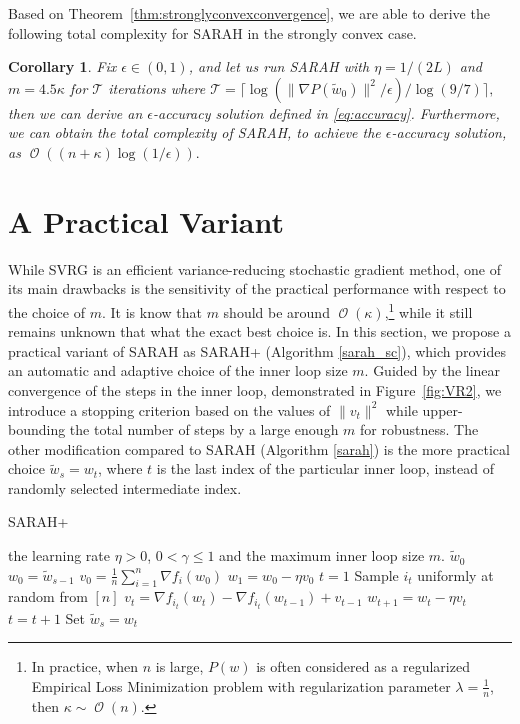 \documentclass{article}
\newtheorem{cor}{Corollary}
\DeclareMathOperator{\Ocal}{\mathcal{O}}
\newcommand{\setn}{[n]}
\begin{document}
Based on Theorem~\ref{thm:stronglyconvexconvergence}, we are able to derive the following total complexity for SARAH in the strongly convex case.
\begin{cor}\label{cor:complexity}
Fix $\epsilon\in(0,1)$, and let us run SARAH with $\eta = 1/(2L)$ and $m = 4.5\kappa$ for $\mathcal{T}$ iterations where
$\mathcal{T} = \lceil \log(\|\nabla P(\tilde{w}_0)\|^2/\epsilon)/\log(9/7) \rceil,$
then we can derive an $\epsilon$-accuracy solution defined in \eqref{eq:accuracy}. Furthermore, we can obtain the total complexity of SARAH, to achieve the $\epsilon$-accuracy solution, as
$\Ocal\left((n+\kappa)\log(1/\epsilon)\right).$
\end{cor}

\section{A Practical Variant}
\label{sec:sarahplus}
While SVRG is an efficient variance-reducing stochastic gradient method, one of its main drawbacks is the sensitivity of the practical performance with respect to the choice of $m$. It is know that $m$ should be around $\Ocal(\kappa)$,\footnote{
In practice, when $n$ is large, $P(w)$ is often considered as a regularized Empirical Loss Minimization problem with regularization parameter $\lambda = \frac1n$, then $\kappa \sim \Ocal(n).$
}
 while it still remains unknown that what the exact best choice is. In this section, we propose a practical variant of SARAH as SARAH+ (Algorithm \ref{sarah_sc}), which provides an automatic and adaptive  choice of the inner loop size $m$. Guided by the linear convergence of the steps in the inner loop, demonstrated in Figure~\ref{fig:VR2}, we introduce a stopping criterion based on the values of $\|v_t\|^2$ while upper-bounding the total number of steps by a large enough $m$ for robustness. The other modification compared to SARAH (Algorithm \ref{sarah}) is the more practical choice $\tilde{w}_s = w_{t}$, where $t$ is the last index of the particular  inner loop, instead of randomly selected intermediate index. 
 \begin{algorithm} 
   \caption{SARAH+}
   \label{sarah_sc}
\begin{algorithmic}
    the learning rate $\eta > 0$, $0 < \gamma \leq 1$ and the maximum inner loop size $m$. 
    $\tilde{w}_0$
   \STATE $w_0 = \tilde{w}_{s-1}$
   \STATE $v_0 = \frac{1}{n}\sum_{i=1}^{n} \nabla f_i(w_0)$
   \STATE $w_1 = w_0 - \eta v_0$
   \STATE $t = 1$
   \STATE Sample $i_{t}$ uniformly at random from $\setn$
   \STATE $v_{t} = \nabla f_{i_{t}} (w_{t}) - \nabla f_{i_{t}}(w_{t-1}) + v_{t-1}$
   \STATE $w_{t+1} = w_{t} - \eta v_{t}$
   \STATE $t = t + 1$
   \ENDWHILE
   \STATE Set $\tilde{w}_s = w_{t}$
   \ENDFOR
\end{algorithmic}
\end{algorithm} 
 
\end{document}
